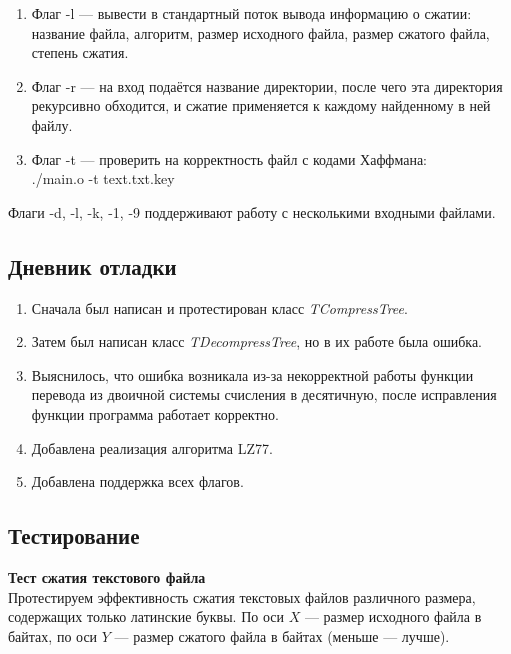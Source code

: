 \documentclass[12pt]{article}
\begin{document}
\begin{enumerate}
        \item Флаг -l — вывести в стандартный поток вывода информацию о 
        сжатии: название файла, алгоритм, размер исходного файла, размер 
        сжатого файла, степень сжатия.

        \item Флаг -r — на вход подаётся название директории, после чего эта 
        директория рекурсивно обходится, и сжатие применяется к каждому 
        найденному в ней файлу.

        \item Флаг -t — проверить на корректность файл с кодами Хаффмана: \\
        ./main.o -t text.txt.key
    \end{enumerate}

    Флаги -d, -l, -k, -1, -9 поддерживают работу с несколькими входными файлами. 

    \subsection*{Дневник отладки}

    \begin{enumerate}
    \item Сначала был написан и протестирован класс \textit{TCompressTree}.
    \item Затем был написан класс \textit{TDecompressTree}, но в их работе была 
        ошибка.
    \item Выяснилось, что ошибка возникала из-за некорректной работы функции 
        перевода из двоичной системы счисления в десятичную, после исправления 
        функции программа работает корректно.
    \item Добавлена реализация алгоритма LZ77.
    \item Добавлена поддержка всех флагов.
    \end{enumerate}

    \subsection*{Тестирование}

    \textbf{Тест сжатия текстового файла} \\
    Протестируем эффективность сжатия текстовых файлов различного размера, 
    содержащих только латинские буквы. По оси $X$ — размер исходного файла в 
    байтах, по оси $Y$ — размер сжатого файла в байтах (меньше — лучше).

\end{document}
